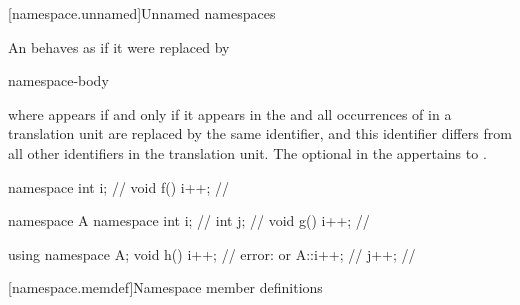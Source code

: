 [namespace.unnamed]{Unnamed namespaces}%

\pnum
An  behaves as if it were
replaced by

\begin{ncsimplebnf}
  \terminal{\uniquens} \br
{} \terminal{\uniquens} \terminal{;}\br
{} \terminal{\uniquens} \terminal{\{} namespace-body \terminal{\}}
\end{ncsimplebnf}

where
 appears if and only if it appears in the
and all occurrences of \tcode{\uniquens} in a translation unit are replaced by
the same identifier, and this identifier differs from all other
identifiers in the translation unit.
The optional 
in the 
appertains to \tcode{\uniquens}.
\begin{example}
\begin{codeblock}
namespace { int i; }            // 
void f() { i++; }               // 

namespace A {
  namespace {
    int i;                      // 
    int j;                      // 
  }
  void g() { i++; }             // 
}

using namespace A;
void h() {
  i++;                          // error:  or 
  A::i++;                       // 
  j++;                          // 
}
\end{codeblock}
\end{example}

[namespace.memdef]{Namespace member definitions}%

